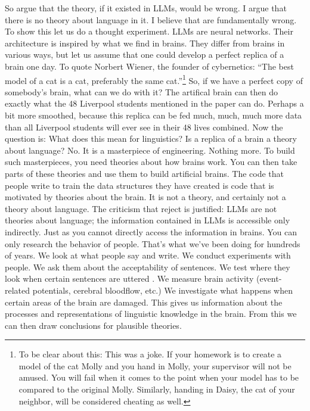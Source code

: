 So \citet{FoxKatzir2024a} argue that the theory, if it existed in LLMs, would be wrong. I argue that
there is no theory about language in it. I believe that \citet{AmbridgeBlything2024a} are
fundamentally wrong. To show this let us do a thought experiment. LLMs are neural networks. Their
architecture is inspired by what we find in brains. They differ from brains in various ways, but let
us assume that one could develop a perfect replica of a brain one day. To quote
Norbert Wiener, the founder of cybernetics: ``The best model of a cat is a cat, preferably the same
cat.''\footnote{%
To be clear about this: This was a joke. If your homework is to create a model of the cat Molly and
you hand in Molly, your supervisor will not be amused. You will fail when it comes to the point when
your model has to be compared to the original Molly. Similarly, handing in Daisy, the cat of your
neighbor, will be considered cheating as well.
} So, if we have a perfect copy of somebody's brain, what can we do with it? The artifical brain can then do exactly what
the 48 Liverpool students mentioned in the  paper can do. Perhaps a
bit more smoothed, because this replica can be fed much, much, much more data than all Liverpool
students will ever see in their 48 lives combined. Now the question is: What does this mean for
linguistics? Is a replica of a brain a theory about language? No. It is a masterpiece of
engineering. Nothing more. To build such masterpieces, you need theories about how brains work. You can then take parts of these theories and use them to build
artificial brains. The code that people write to train the data structures they have created is code
that is motivated by theories about the brain. It is not a theory, and certainly not a theory about
language. The criticism that  reject is justified: LLMs are not
theories about language; the information contained in LLMs is accessible only indirectly. Just as
you cannot directly access the information in brains. You can only research the behavior of
people. That's what we've been doing for hundreds of years. We look at what people say and write. We
conduct experiments with people. We ask them about the acceptability of sentences. We test where
they look when certain sentences are uttered \citep{TSKES96a}. We measure brain activity (event-related potentials,
cerebral bloodflow, etc.) We investigate what happens when certain areas of the brain are damaged.
This gives us information about the processes and representations of linguistic knowledge in the
brain. From this we can then draw conclusions for plausible theories.  

